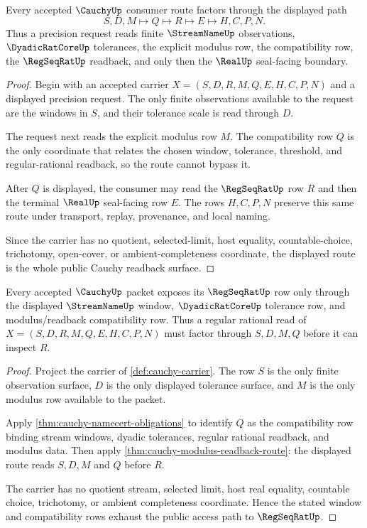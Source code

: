 \begin{theorem}
\label{thm:cauchy-modulus-readback-route}
Every accepted $\CauchyUp$ consumer route factors through the displayed path
$$
S,D,M \longmapsto Q \longmapsto R \longmapsto E \longmapsto H,C,P,N .
$$
Thus a precision request reads finite $\StreamNameUp$ observations, $\DyadicRatCoreUp$ tolerances, the explicit modulus row, the compatibility row, the $\RegSeqRatUp$ readback, and only then the $\RealUp$ seal-facing boundary.
\end{theorem}
\begin{proof}
Begin with an accepted carrier $X=(S,D,R,M,Q,E,H,C,P,N)$ and a displayed precision request. The only finite observations available to the request are the windows in $S$, and their tolerance scale is read through $D$.

The request next reads the explicit modulus row $M$. The compatibility row $Q$ is the only coordinate that relates the chosen window, tolerance, threshold, and regular-rational readback, so the route cannot bypass it.

After $Q$ is displayed, the consumer may read the $\RegSeqRatUp$ row $R$ and then the terminal $\RealUp$ seal-facing row $E$. The rows $H,C,P,N$ preserve this same route under transport, replay, provenance, and local naming.

Since the carrier has no quotient, selected-limit, host equality, countable-choice, trichotomy, open-cover, or ambient-completeness coordinate, the displayed route is the whole public Cauchy readback surface.
\end{proof}

\begin{theorem}
\label{thm:cauchy-core-streamname-regseqrat-window}
Every accepted $\CauchyUp$ packet exposes its $\RegSeqRatUp$ row only through the displayed $\StreamNameUp$ window, $\DyadicRatCoreUp$ tolerance row, and modulus/readback compatibility row. Thus a regular rational read of $X=(S,D,R,M,Q,E,H,C,P,N)$ must factor through $S,D,M,Q$ before it can inspect $R$.
\end{theorem}
\begin{proof}
Project the carrier of \autoref{def:cauchy-carrier}. The row $S$ is the only finite observation surface, $D$ is the only displayed tolerance surface, and $M$ is the only modulus row available to the packet.

Apply \autoref{thm:cauchy-namecert-obligations} to identify $Q$ as the compatibility row binding stream windows, dyadic tolerances, regular rational readback, and modulus data. Then apply \autoref{thm:cauchy-modulus-readback-route}: the displayed route reads $S,D,M$ and $Q$ before $R$.

The carrier has no quotient stream, selected limit, host real equality, countable choice, trichotomy, or ambient completeness coordinate. Hence the stated window and compatibility rows exhaust the public access path to $\RegSeqRatUp$.
\end{proof}

